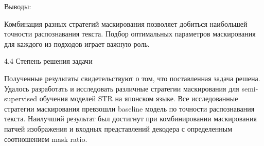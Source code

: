 Выводы:

Комбинация  разных  стратегий  маскирования  позволяет  добиться  наибольшей  точности  распознавания  текста. 
Подбор  оптимальных  параметров  маскирования  для  каждого  из  подходов  играет  важную  роль.

 4.4  Степень решения задачи

Полученные  результаты  свидетельствуют  о  том,  что  поставленная  задача  решена.  Удалось  разработать  и  исследовать  различные  стратегии  маскирования  для  semi-supervised  обучения  моделей  STR  на  японском  языке.  Все  исследованные  стратегии  маскирования  превзошли  baseline  модель  по  точности  распознавания  текста.  Наилучший  результат  был  достигнут  при  комбинировании  маскирования  патчей  изображения  и  входных  представлений  декодера  с  определенным  соотношением  mask ratio. 
\newpage